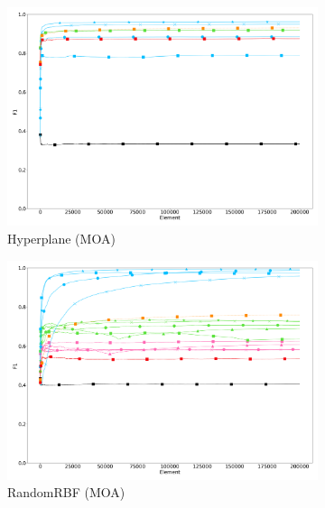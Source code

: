 \begin{figure}
\begin{subfigure}[t]{.49\linewidth}
	\end{subfigure}\\
	\begin{subfigure}[t]{.49\linewidth}
		\includegraphics[width=\linewidth]{figures/results/dataset_1_f1.png}
		\caption{Hyperplane (MOA)}
		\label{fig:f1-dataset_1}
	\end{subfigure}
	\begin{subfigure}[t]{.49\linewidth}
		\includegraphics[width=\linewidth]{figures/results/dataset_2_f1.png}
		\caption{RandomRBF (MOA)}
		\label{fig:f1-dataset_2}
	\end{subfigure}\\
	\begin{subfigure}[t]{.49\linewidth}

\end{subfigure}
\end{figure}
